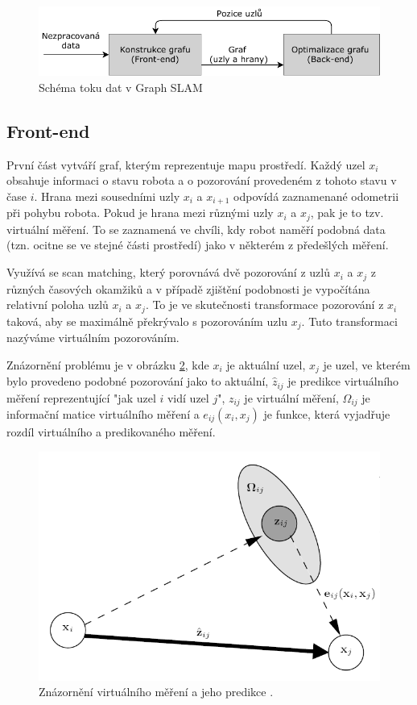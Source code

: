 \documentclass[12pt,a4paper]{report}
\begin{document}
\begin{figure}[H]
\centering
\includegraphics[scale=1.2]{img/Obr3.pdf}
\caption{Schéma toku dat v Graph SLAM}
\label{3}
\end{figure}

\subsection{Front-end}
První část vytváří graf, kterým reprezentuje mapu prostředí. Každý uzel $x_i$ obsahuje informaci o stavu robota a o pozorování provedeném z tohoto stavu v čase $i$. Hrana mezi sousedními uzly $x_i$ a $x_{i+1}$ odpovídá zaznamenané odometrii při pohybu robota. Pokud je hrana mezi různými uzly $x_i$ a $x_j$, pak je to tzv. virtuální měření. To se zaznamená ve chvíli, kdy robot naměří podobná data (tzn. ocitne se ve stejné části prostředí) jako v některém z předešlých měření. 

Využívá se scan matching, který porovnává dvě pozorování z uzlů $x_i$ a $x_j$ z různých časových okamžiků a v případě zjištění podobnosti je vypočítána relativní poloha uzlů $x_i$ a $x_j$. To je ve skutečnosti transformace pozorování z $x_i$ taková, aby se maximálně překrývalo s pozorováním uzlu $x_j$. Tuto transformaci nazýváme virtuálním pozorováním.

Znázornění problému je v obrázku \ref{4}, kde $x_i$ je aktuální uzel, $x_j$ je uzel, ve kterém bylo provedeno podobné pozorování jako to aktuální, $\hat{z}_{ij}$ je predikce virtuálního měření reprezentující "jak uzel $i$ vidí uzel $j$", $z_{ij}$ je virtuální měření, $\Omega_{ij}$ je informační matice virtuálního měření a $e_{ij}(x_i, x_j)$ je funkce, která vyjadřuje rozdíl virtuálního a predikovaného měření.
\begin{figure}[H]
\centering
\includegraphics[scale=0.8]{img/Obr4_b}
\caption{Znázornění virtuálního měření a jeho predikce \cite{tutorialGraph}.}
\label{4}
\end{figure}
\end{document}
